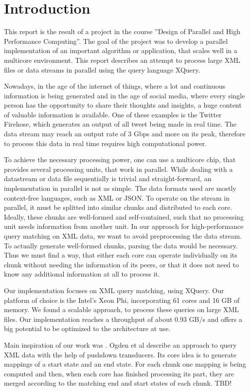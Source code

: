 \section{Introduction}\label{sec:intro}

This report is the result of a project in the course ''Design of Parallel and High Performance Computing''. The goal of the project was to develop a parallel implementation of an important algorithm or application, that scales well in a multicore environment. This report describes an attempt to process large XML files or data streams in parallel using the query language XQuery.

 Nowadays, in the age of the internet of things, where a lot and continuous information is being generated and in the age of social media, where every single person has the opportunity to share their thoughts and insights, a huge content of valuable information is available. One of these examples is the Twitter Firehose, which generates an output of all tweet being made in real time. The data stream may reach an output rate of 3 Gbps and more on  its peak, therefore to process this data in real time requires high computational power.

To achieve the necessary processing power, one can use a multicore chip, that provides several processing units, that work in parallel. While dealing with a datastream or data file sequentially is trivial and straight-forward, an implementation in parallel is not as simple. The data formats used are mostly context-free languages, such as XML or JSON. To operate on the stream in parallel, it must be splitted into similar chunks and distributed to each core. Ideally, these chunks are well-formed and self-contained, such that no processing unit needs information from another unit. In our approach for high-performance query matching on XML data, we want to avoid preprocessing the data stream. To actually generate well-formed chunks, parsing the data would be necessary. Thus we must find a way, that either each core can operate individually on its chunk without needing the information of its peers, or that it does not need to know any additional information at all to process it.

Our implementation focuses on XML query matching, using XQuery. Our platform of choice is the Intel's Xeon Phi, incorporating 61 cores and 16 GB of memory. We found a scalable approach, to process these queries on large XML files. Our implementation reaches a throughput of about 0.93 GB/s and offers a big potential to be optimized to the architecture at use. 

 Main inspiration of our work was \cite{Ogden2013}. Ogden et al describe an approach to query XML data with the help of pushdown transducers. Its core idea is to generate mappings of a start state and an end state. For each chunk one mapping is being computed and then, when each core has finished processing its part, they are merged according to the matching end and start states of each chunk.
TBD!
